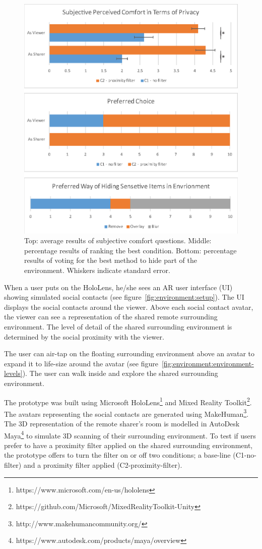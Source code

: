 \begin{figure}[t]
  \centering
  \includegraphics[width=\columnwidth]{images/ismar18/images-04.eps}
  \caption{Top: average results of subjective comfort questions. Middle: percentage results of ranking the best condition. Bottom: percentage results of voting for the best method to hide part of the environment. Whiskers indicate standard error.}
  \label{fig:environment:results}
\end{figure}

When a user puts on the HoloLens, he/she sees an AR user interface (UI) showing simulated social contacts (see figure~\ref{fig:environment:setup}). The UI displays the social contacts around the viewer. Above each social contact avatar, the viewer can see a representation of the shared remote surrounding environment. The level of detail of the shared surrounding environment is determined by the social proximity with the viewer.

The user can air-tap on the floating surrounding environment above an avatar to expand it to life-size around the avatar (see figure~\ref{fig:environment:environment-levels}). The user can walk inside and explore the shared surrounding environment.

The prototype was built using Microsoft HoloLens\footnote{https://www.microsoft.com/en-us/hololens} and Mixed Reality Toolkit\footnote{https://github.com/Microsoft/MixedRealityToolkit-Unity}. The avatars representing the social contacts are generated using MakeHuman\footnote{http://www.makehumancommunity.org/}. The 3D representation of the remote sharer's room is modelled in AutoDesk Maya\footnote{https://www.autodesk.com/products/maya/overview} to simulate 3D scanning of their surrounding environment. To test if users prefer to have a proximity filter applied on the shared surrounding environment, the prototype offers to turn the filter on or off two conditions; a base-line (C1-no-filter) and a proximity filter applied (C2-proximity-filter).



